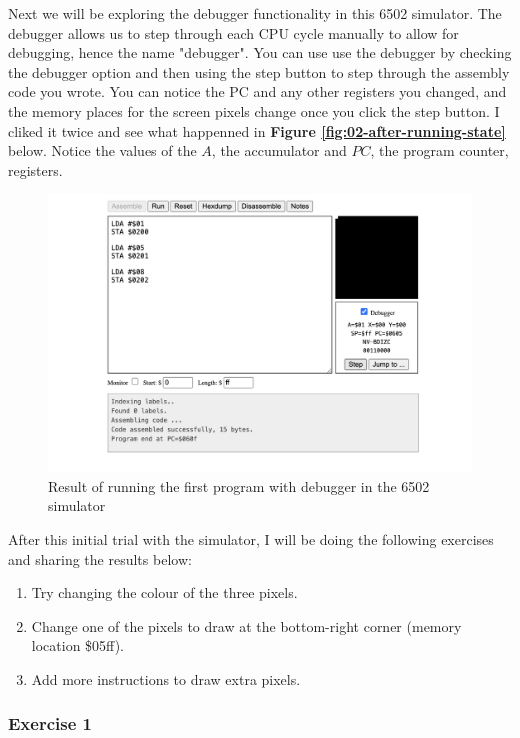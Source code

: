 \documentclass[a4paper]{article}
\begin{document}
Next we will be exploring the debugger functionality in this 6502 simulator. The debugger allows us to step through each CPU cycle manually to allow for debugging, hence the name "debugger". You can use use the debugger by checking the debugger option and then using the step button to step through the assembly code you wrote. You can notice the PC and any other registers you changed, and the memory places for the screen pixels change once you click the step button. I cliked it twice and see what happenned in \textbf{Figure \ref{fig:02-after-running-state}} below. Notice the values of the $A$, the accumulator and $PC$, the program counter, registers.

\begin{figure}[H]
    \centering
    \includegraphics[width=1.0\textwidth]{res/images/q2/03-debugger-first-step.png}
    \caption{Result of running the first program with debugger in the 6502 simulator}
    \label{fig:03-debugger-first-step}
\end{figure}

After this initial trial with the simulator, I will be doing the following exercises and sharing the results below:
\begin{enumerate}
    \item Try changing the colour of the three pixels.
    \item Change one of the pixels to draw at the bottom-right corner (memory location \$05ff).
    \item Add more instructions to draw extra pixels.
\end{enumerate}

\subsubsection{Exercise 1}
\end{document}
